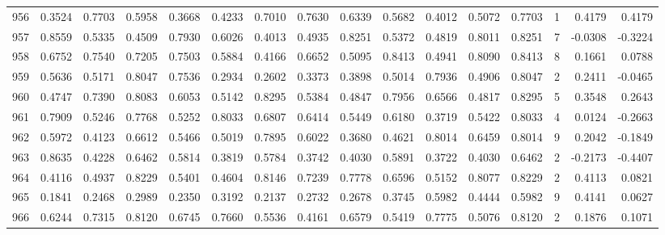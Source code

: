 \begin{tabular}{lrrrrrrrrrrrrrrr}
956 &      0.3524 &  0.7703 &  0.5958 &  0.3668 &  0.4233 &  0.7010 &  0.7630 &  0.6339 &  0.5682 &  0.4012 &   0.5072 &     0.7703 &      1 &                    0.4179 &                     0.4179 \\
957 &      0.8559 &  0.5335 &  0.4509 &  0.7930 &  0.6026 &  0.4013 &  0.4935 &  0.8251 &  0.5372 &  0.4819 &   0.8011 &     0.8251 &      7 &                   -0.0308 &                    -0.3224 \\
958 &      0.6752 &  0.7540 &  0.7205 &  0.7503 &  0.5884 &  0.4166 &  0.6652 &  0.5095 &  0.8413 &  0.4941 &   0.8090 &     0.8413 &      8 &                    0.1661 &                     0.0788 \\
959 &      0.5636 &  0.5171 &  0.8047 &  0.7536 &  0.2934 &  0.2602 &  0.3373 &  0.3898 &  0.5014 &  0.7936 &   0.4906 &     0.8047 &      2 &                    0.2411 &                    -0.0465 \\
960 &      0.4747 &  0.7390 &  0.8083 &  0.6053 &  0.5142 &  0.8295 &  0.5384 &  0.4847 &  0.7956 &  0.6566 &   0.4817 &     0.8295 &      5 &                    0.3548 &                     0.2643 \\
961 &      0.7909 &  0.5246 &  0.7768 &  0.5252 &  0.8033 &  0.6807 &  0.6414 &  0.5449 &  0.6180 &  0.3719 &   0.5422 &     0.8033 &      4 &                    0.0124 &                    -0.2663 \\
962 &      0.5972 &  0.4123 &  0.6612 &  0.5466 &  0.5019 &  0.7895 &  0.6022 &  0.3680 &  0.4621 &  0.8014 &   0.6459 &     0.8014 &      9 &                    0.2042 &                    -0.1849 \\
963 &      0.8635 &  0.4228 &  0.6462 &  0.5814 &  0.3819 &  0.5784 &  0.3742 &  0.4030 &  0.5891 &  0.3722 &   0.4030 &     0.6462 &      2 &                   -0.2173 &                    -0.4407 \\
964 &      0.4116 &  0.4937 &  0.8229 &  0.5401 &  0.4604 &  0.8146 &  0.7239 &  0.7778 &  0.6596 &  0.5152 &   0.8077 &     0.8229 &      2 &                    0.4113 &                     0.0821 \\
965 &      0.1841 &  0.2468 &  0.2989 &  0.2350 &  0.3192 &  0.2137 &  0.2732 &  0.2678 &  0.3745 &  0.5982 &   0.4444 &     0.5982 &      9 &                    0.4141 &                     0.0627 \\
966 &      0.6244 &  0.7315 &  0.8120 &  0.6745 &  0.7660 &  0.5536 &  0.4161 &  0.6579 &  0.5419 &  0.7775 &   0.5076 &     0.8120 &      2 &                    0.1876 &                     0.1071 \\

\end{tabular}
